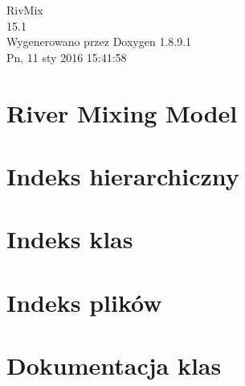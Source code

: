 \documentclass[twoside]{book}
\newcommand{\+}{\discretionary{\mbox{\scriptsize$\hookleftarrow$}}{}{}}
\newcommand{\clearemptydoublepage}{%
  \newpage{\pagestyle{empty}\cleardoublepage}%
}
\begin{document}
\hypersetup{pageanchor=false,
             bookmarks=true,
             bookmarksnumbered=true,
             pdfencoding=unicode
            }
\begin{titlepage}
\vspace*{7cm}
\begin{center}%
{\Large Riv\+Mix \\[1ex]\large 15.\+1 }\\
\vspace*{1cm}
{\large Wygenerowano przez Doxygen 1.8.9.1}\\
\vspace*{0.5cm}
{\small Pn, 11 sty 2016 15:41:58}\\
\end{center}
\end{titlepage}
\clearemptydoublepage
\tableofcontents
\clearemptydoublepage
{}
\hypersetup{pageanchor=true}

\chapter{River Mixing Model}
\label{index}\hypertarget{index}{}
\chapter{Indeks hierarchiczny}

\chapter{Indeks klas}

\chapter{Indeks plików}

\chapter{Dokumentacja klas}


















\end{document}
